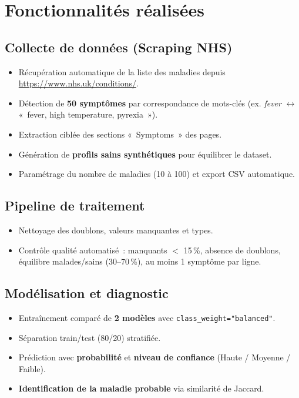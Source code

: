 \documentclass[11pt,a4paper]{article}
\begin{document}
\section{Fonctionnalités réalisées}

\subsection{Collecte de données (Scraping NHS)}
\begin{itemize}
  \item Récupération automatique de la liste des maladies depuis \url{https://www.nhs.uk/conditions/}.
  \item Détection de \textbf{50 symptômes} par correspondance de mots-clés (ex. \textit{fever} $\leftrightarrow$ «~fever, high temperature, pyrexia~»).
  \item Extraction ciblée des sections «~Symptoms~» des pages.
  \item Génération de \textbf{profils sains synthétiques} pour équilibrer le dataset.
  \item Paramétrage du nombre de maladies (10 à 100) et export CSV automatique.
\end{itemize}

\subsection{Pipeline de traitement}
\begin{itemize}
  \item Nettoyage des doublons, valeurs manquantes et types.
  \item Contrôle qualité automatisé~: manquants $<$ 15\,\%, absence de doublons, équilibre malades/sains (30--70\,\%), au moins 1 symptôme par ligne.
\end{itemize}

\subsection{Modélisation et diagnostic}
\begin{itemize}
  \item Entraînement comparé de \textbf{2 modèles} avec \texttt{class\_weight="balanced"}.
  \item Séparation train/test (80/20) stratifiée.
  \item Prédiction avec \textbf{probabilité} et \textbf{niveau de confiance} (Haute / Moyenne / Faible).
  \item \textbf{Identification de la maladie probable} via similarité de Jaccard.
\end{itemize}
\end{document}
